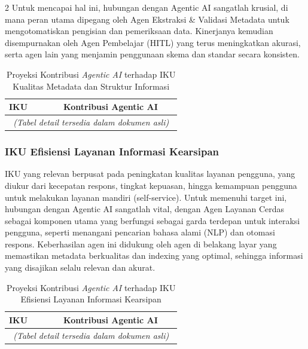 \documentclass[12pt,a4paper]{article}
\begin{document}
\begin{multicols}{2}
Untuk mencapai hal ini, hubungan dengan Agentic AI sangatlah krusial, di mana peran utama dipegang oleh Agen Ekstraksi \& Validasi Metadata untuk mengotomatiskan pengisian dan pemeriksaan data. Kinerjanya kemudian disempurnakan oleh Agen Pembelajar (HITL) yang terus meningkatkan akurasi, serta agen lain yang menjamin penggunaan skema dan standar secara konsisten.

\begin{table}[htbp]
\centering
\caption{Proyeksi Kontribusi \emph{Agentic AI} terhadap IKU Kualitas Metadata dan Struktur Informasi}
\label{tab:iku_metadata}
\begin{tabular}{|p{0.3\linewidth}|p{0.65\linewidth}|}
\hline
\textbf{IKU} & \textbf{Kontribusi Agentic AI} \\
\hline
\multicolumn{2}{|c|}{\emph{(Tabel detail tersedia dalam dokumen asli)}} \\
\hline
\end{tabular}
\end{table}

\subsubsection{IKU Efisiensi Layanan Informasi Kearsipan}

IKU yang relevan berpusat pada peningkatan kualitas layanan pengguna, yang diukur dari kecepatan respons, tingkat kepuasan, hingga kemampuan pengguna untuk melakukan layanan mandiri (self-service). Untuk memenuhi target ini, hubungan dengan Agentic AI sangatlah vital, dengan Agen Layanan Cerdas sebagai komponen utama yang berfungsi sebagai garda terdepan untuk interaksi pengguna, seperti menangani pencarian bahasa alami (NLP) dan otomasi respons. Keberhasilan agen ini didukung oleh agen di belakang layar yang memastikan metadata berkualitas dan indexing yang optimal, sehingga informasi yang disajikan selalu relevan dan akurat.

\begin{table}[htbp]
\centering
\caption{Proyeksi Kontribusi \emph{Agentic AI} terhadap IKU Efisiensi Layanan Informasi Kearsipan}
\label{tab:iku_layanan}
\begin{tabular}{|p{0.3\linewidth}|p{0.65\linewidth}|}
\hline
\textbf{IKU} & \textbf{Kontribusi Agentic AI} \\
\hline
\multicolumn{2}{|c|}{\emph{(Tabel detail tersedia dalam dokumen asli)}} \\
\hline
\end{tabular}
\end{table}


\end{multicols}
\end{document}
